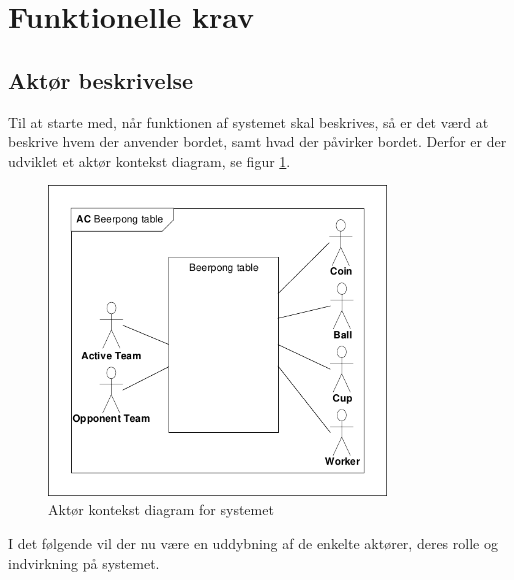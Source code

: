\documentclass[Kravspecifikation/Kravspec_Main.tex]{subfiles}
\begin{document}
\section{Funktionelle krav}

\subsection{Aktør beskrivelse}
Til at starte med, når funktionen af systemet skal beskrives, så er det værd at beskrive hvem der anvender bordet, samt hvad der påvirker bordet. Derfor er der udviklet et aktør kontekst diagram, se figur \ref{fig:Actor-context}.
\begin{figure}[H]
    \centering
    \includegraphics[width=0.8\textwidth,trim={0.24in 0.24in 0.24in 0.24in},clip, page=1]{Kravspecifikation/Funktionelle_krav/graphics_funktionel/Krav-spec-diagrammer.pdf}
    \caption{Aktør kontekst diagram for systemet}
    \label{fig:Actor-context}
\end{figure}
I det følgende vil der nu være en uddybning af de enkelte aktører, deres rolle og indvirkning på systemet.
\end{document}
